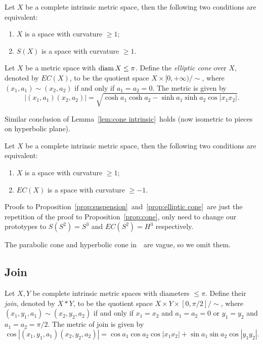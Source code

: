 \begin{prop}\label{prop:suspension}
    Let $X$ be a complete intrinsic metric space, then the following two conditions are equivalent:
    \begin{enumerate}[\rm (a)]
        \item $X$ is a space with curvature $\geq 1$;
        \item $S(X)$ is a space with curvature $\geq 1$.
    \end{enumerate}
\end{prop}

\begin{defn}
    Let $X$ be a metric space with $\operatorname{diam}{X}\leq\pi$.
    Define the \emph{elliptic cone} over $X$, denoted by $EC(X)$, to be the quotient space $X\times[0,+\infty)/\sim$, where $(x_1,a_1)\sim(x_2,a_2)$ if and only if $a_1=a_2=0$.
    The metric is given by
    \[|(x_1,a_1)(x_2,a_2)|=\sqrt{\cosh{a_1}\cosh{a_2}-\sinh{a_1}\sinh{a_2}\cos{|x_1x_2|}}.\]
\end{defn}

Similar conclusion of Lemma~\ref{lem:cone intrinsic}~holds (now isometric to pieces on hyperbolic plane).

\begin{prop}\label{prop:elliptic cone}
    Let $X$ be a complete intrinsic metric space, then the following two conditions are equivalent:
    \begin{enumerate}[\rm (a)]
        \item $X$ is a space with curvature $\geq 1$;
        \item $EC(X)$ is a space with curvature $\geq -1$.
    \end{enumerate}
\end{prop}

Proofs to Proposition~\ref{prop:suspension}~and~\ref{prop:elliptic cone}~are just the repetition of the proof to Proposition~\ref{prop:cone}, only need to change our prototypes to $S(S^2)=S^3$ and $EC(S^2)=H^3$ respectively.

\begin{rem}
    The parabolic cone and hyperbolic cone in~\cite{buragoADAlexandrovSpaces1992}~are vague, so we omit them.
\end{rem}

\subsection{Join}

\begin{defn}
    Let $X,Y$ be complete intrinsic metric spaces with diameters $\leq\pi$.
    Define their \emph{join}, denoted by $X\ast Y$, to be the quotient space $X\times Y\times[0,\pi/2]/\sim$, where $(x_1,y_1,a_1)\sim(x_2,y_2,a_2)$ if and only if $x_1=x_2$ and $a_1=a_2=0$ or $y_1=y_2$ and $a_1=a_2=\pi/2$.
    The metric of join is given by
    \[\cos{|(x_1,y_1,a_1)(x_2,y_2,a_2)|}=\cos{a_1}\cos{a_2}\cos{|x_1x_2|}+\sin{a_1}\sin{a_2}\cos{|y_1y_2|}.\]
\end{defn}

